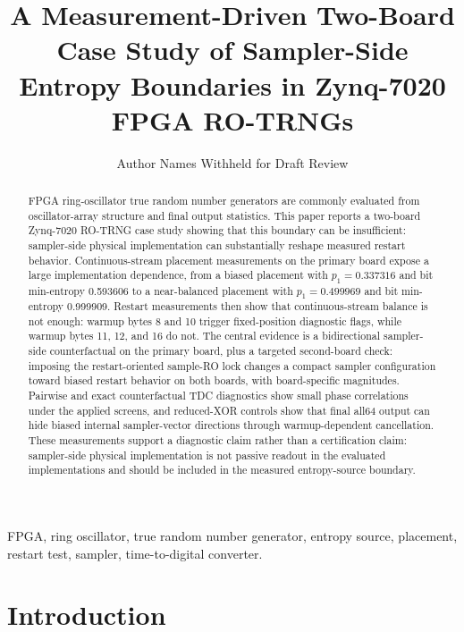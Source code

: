 \documentclass[journal]{IEEEtran}
\newcommand{\rotrng}{RO-TRNG}
\newcommand{\tdc}{TDC}
\begin{document}
\title{A Measurement-Driven Two-Board Case Study of Sampler-Side Entropy Boundaries in Zynq-7020 FPGA RO-TRNGs}

\author{Author Names Withheld for Draft Review}

\maketitle

\begin{abstract}
FPGA ring-oscillator true random number generators are commonly evaluated from oscillator-array structure and final output statistics. This paper reports a two-board Zynq-7020 \rotrng{} case study showing that this boundary can be insufficient: sampler-side physical implementation can substantially reshape measured restart behavior. Continuous-stream placement measurements on the primary board expose a large implementation dependence, from a biased placement with $p_1=0.337316$ and bit min-entropy 0.593606 to a near-balanced placement with $p_1=0.499969$ and bit min-entropy 0.999909. Restart measurements then show that continuous-stream balance is not enough: warmup bytes 8 and 10 trigger fixed-position diagnostic flags, while warmup bytes 11, 12, and 16 do not. The central evidence is a bidirectional sampler-side counterfactual on the primary board, plus a targeted second-board check: imposing the restart-oriented sample-RO lock changes a compact sampler configuration toward biased restart behavior on both boards, with board-specific magnitudes. Pairwise and exact counterfactual \tdc{} diagnostics show small phase correlations under the applied screens, and reduced-XOR controls show that final all64 output can hide biased internal sampler-vector directions through warmup-dependent cancellation. These measurements support a diagnostic claim rather than a certification claim: sampler-side physical implementation is not passive readout in the evaluated implementations and should be included in the measured entropy-source boundary.
\end{abstract}

\begin{IEEEkeywords}
FPGA, ring oscillator, true random number generator, entropy source, placement, restart test, sampler, time-to-digital converter.
\end{IEEEkeywords}

\section{Introduction}
\end{document}
